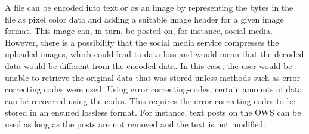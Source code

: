 A file can be encoded into text or as an image by representing the bytes in the file as pixel color data and adding a suitable image header for a given image format. This image can, in turn, be posted on, for instance, social media. However, there is a possibility that the social media service compresses the uploaded images, which could lead to data loss and would mean that the decoded data would be different from the encoded data. In this case, the user would be unable to retrieve the original data that was stored unless methods such as \mbox{error-correcting} codes were used. Using error \mbox{correcting-codes}, certain amounts of data can be recovered using the codes. This requires the \mbox{error-correcting} codes to be stored in an ensured lossless format. For instance, text posts on the \gls{OWS} can be used as long as the posts are not removed and the text is not modified.